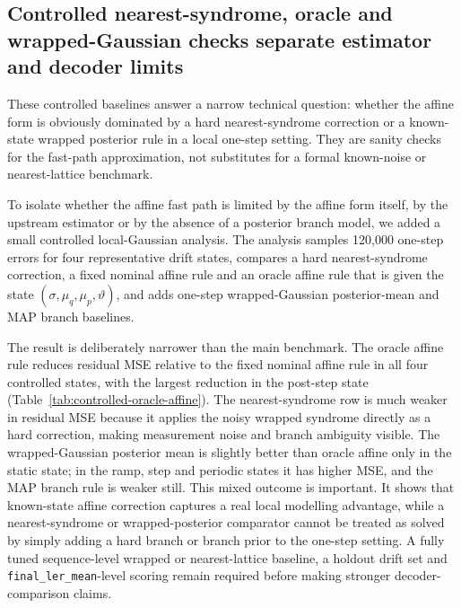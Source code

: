 \documentclass[11pt]{article}
\newcommand{\finalLER}{\texttt{final\_ler\_mean}}
\begin{document}
\subsection{Controlled nearest-syndrome, oracle and wrapped-Gaussian checks separate estimator and decoder limits}

These controlled baselines answer a narrow technical question: whether the
affine form is obviously dominated by a hard nearest-syndrome correction or a
known-state wrapped posterior rule in a local one-step setting.  They are
sanity checks for the fast-path approximation, not substitutes for a formal
known-noise or nearest-lattice benchmark.

To isolate whether the affine fast path is limited by the affine form itself,
by the upstream estimator or by the absence of a posterior branch model, we
added a small controlled local-Gaussian analysis.
The analysis samples 120,000 one-step errors for four representative drift
states, compares a hard nearest-syndrome correction, a fixed nominal affine
rule and an oracle affine rule that is given the state
\((\sigma,\mu_q,\mu_p,\vartheta)\), and adds one-step wrapped-Gaussian
posterior-mean and MAP branch baselines.

The result is deliberately narrower than the main benchmark.  The oracle
affine rule reduces residual MSE relative to the fixed nominal affine rule in
all four controlled states, with the largest reduction in the post-step state
(Table~\ref{tab:controlled-oracle-affine}).  The nearest-syndrome row is much
weaker in residual MSE because it applies the noisy wrapped syndrome directly
as a hard correction, making measurement noise and branch ambiguity visible.
The wrapped-Gaussian posterior mean is slightly better than oracle affine only
in the static state; in the ramp, step and periodic states it has higher MSE,
and the MAP branch rule is weaker still.  This mixed outcome is important.  It
shows that known-state affine correction captures a real local modelling
advantage, while a nearest-syndrome or wrapped-posterior comparator cannot be
treated as solved by simply adding a hard branch or branch prior to the
one-step setting.  A fully tuned sequence-level wrapped or nearest-lattice
baseline, a holdout drift set and \finalLER{}-level scoring remain required
before making stronger decoder-comparison claims.
\end{document}
